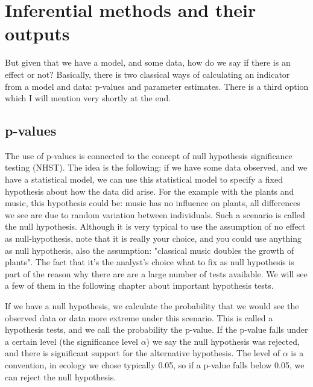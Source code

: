 \documentclass{tufte-book} %
\begin{document}
\section{Inferential methods and their outputs}

But given that we have a model, and some data, how do we say if there is an effect or not? Basically, there is two classical ways of calculating an indicator from a model and data: p-values and parameter estimates. There is a third option which I will mention very shortly at the end. 

\subsection{p-values}

The use of p-values is connected to the concept of null hypothesis significance testing (NHST). The idea is the following: if we have some data observed, and we have a statistical model, we can use this statistical model to specify a fixed hypothesis about how the data did arise. For the example with the plants and music, this hypothesis could be: music has no influence on plants, all differences we see are due to random variation between individuals. Such a scenario is called the null hypothesis.  Although it is very typical to use the assumption of no effect as null-hypothesis, note that it is really your choice, and you could use anything as null hypothesis, also the assumption: "classical music doubles the growth of plants". The fact that it's the analyst's choice what to fix as null hypothesis is part of the reason why there are are a large number of tests available. We will see a few of them in the following chapter about important hypothesis tests.

If we have a null hypothesis, we calculate the probability that we would see the observed data or data more extreme under this scenario. This is called a hypothesis tests, and we call the probability the p-value.  If the p-value falls under a certain level (the significance level $\alpha$) we say the null hypothesis was rejected, and there is significant support for the alternative hypothesis. The level of $\alpha$ is a convention, in ecology we chose typically 0.05, so if a p-value falls below 0.05, we can reject the null hypothesis.  
\end{document}
